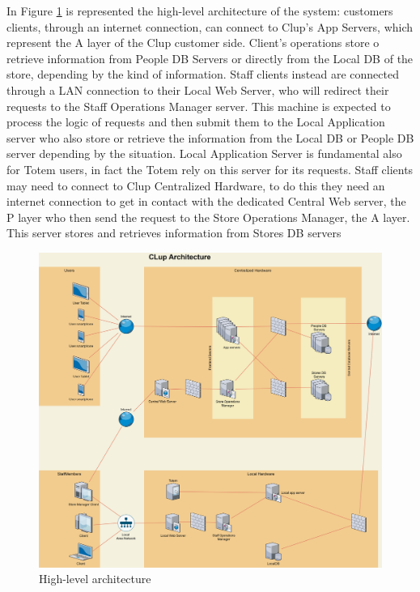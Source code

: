 In Figure \ref{fig:HLArch} is represented the high-level architecture of the system: customers clients, through an internet connection, can connect to Clup's App Servers, which represent the A layer of the Clup customer side. Client's operations store o retrieve information from People DB Servers or directly from the Local DB of the store, depending by the kind of information. Staff clients instead are connected through a LAN connection to their Local Web Server, who will redirect their requests to the Staff Operations Manager server. This machine is expected to process the logic of requests and then submit them to the Local Application server who also store or retrieve the information from the Local DB or People DB server depending by the situation. Local Application Server is fundamental also for Totem users, in fact the Totem rely on this server for its requests. Staff clients may need to connect to Clup Centralized Hardware, to do this they need an internet connection to get in contact with the dedicated Central Web server, the P layer who then send the request to the Store Operations Manager, the A layer. This server stores and retrieves information from Stores DB servers
\begin{figure}[h!]
	\includegraphics[width=\linewidth]{../Diagrams/Archtecture/Architecture_diagram.png}
	\caption{High-level architecture}
	\label{fig:HLArch}
\end{figure}

